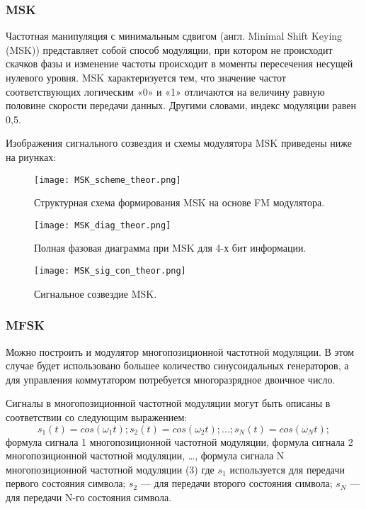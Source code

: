 \subsubsection{MSK}
Частотная манипуляция с минимальным сдвигом (англ. Minimal Shift Keying (MSK)) представляет собой способ модуляции, при котором не происходит скачков фазы и изменение частоты происходит в моменты пересечения несущей нулевого уровня. MSK характеризуется тем, что значение частот соответствующих логическим «0» и «1» отличаются на величину равную половине скорости передачи данных. Другими словами, индекс модуляции равен 0,5.

Изображения сигнального созвездия и схемы модулятора MSK приведены ниже на риунках:
\begin{figure}[H]
	\begin{center}
		\texttt{[image: MSK\_scheme\_theor.png]}
		\caption{Структурная схема формирования MSK на основе FM модулятора.} %
		\label{MSK_scheme_theor} %
	\end{center}
\end{figure}
\begin{figure}[H]
	\begin{center}
		\texttt{[image: MSK\_diag\_theor.png]}
		\caption{Полная фазовая диаграмма при MSK для 4-х бит информации.} %
		\label{MSK_diag_theor} %
	\end{center}
\end{figure}
\begin{figure}[H]
	\begin{center}
		\texttt{[image: MSK\_sig\_con\_theor.png]}
		\caption{Сигнальное созвездие MSK.} %
		\label{MSK_sig_con_theor} %
	\end{center}
\end{figure}

\subsubsection{MFSK}
Можно построить и модулятор многопозиционной частотной модуляции. В этом случае будет использовано большее количество синусоидальных генераторов, а для управления коммутатором потребуется многоразрядное двоичное число.

Сигналы в многопозиционной частотной модуляции могут быть описаны в соответствии со следующим выражением:
\begin{equation}
	s_1 (t) =  cos(\omega_1 t); s_2 (t) =  cos(\omega_2 t); ...; s_N (t) =  cos(\omega_N t); 
\end{equation}
формула сигнала 1 многопозиционной частотной модуляции,  формула сигнала 2 многопозиционной частотной модуляции, …,  формула сигнала N многопозиционной частотной модуляции (3)
где $s_1$ используется для передачи первого состояния символа;
$s_2$ — для передачи второго состояния символа;
$s_N$ — для передачи N-го состояния символа.

